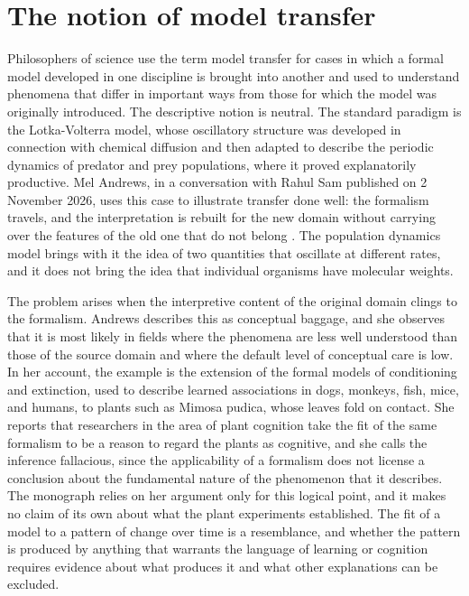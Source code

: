 \documentclass[11pt]{report}
\theoremstyle{remark}
\theoremstyle{definition}
\begin{document}
\section{The notion of model transfer}

Philosophers of science use the term model transfer for cases in which a formal model developed in one discipline is brought into another and used to understand phenomena that differ in important ways from those for which the model was originally introduced. The descriptive notion is neutral. The standard paradigm is the Lotka-Volterra model, whose oscillatory structure was developed in connection with chemical diffusion and then adapted to describe the periodic dynamics of predator and prey populations, where it proved explanatorily productive. Mel Andrews, in a conversation with Rahul Sam published on 2 November 2026, uses this case to illustrate transfer done well: the formalism travels, and the interpretation is rebuilt for the new domain without carrying over the features of the old one that do not belong \cite{andrews2026}. The population dynamics model brings with it the idea of two quantities that oscillate at different rates, and it does not bring the idea that individual organisms have molecular weights.

The problem arises when the interpretive content of the original domain clings to the formalism. Andrews describes this as conceptual baggage, and she observes that it is most likely in fields where the phenomena are less well understood than those of the source domain and where the default level of conceptual care is low. In her account, the example is the extension of the formal models of conditioning and extinction, used to describe learned associations in dogs, monkeys, fish, mice, and humans, to plants such as Mimosa pudica, whose leaves fold on contact. She reports that researchers in the area of plant cognition take the fit of the same formalism to be a reason to regard the plants as cognitive, and she calls the inference fallacious, since the applicability of a formalism does not license a conclusion about the fundamental nature of the phenomenon that it describes. The monograph relies on her argument only for this logical point, and it makes no claim of its own about what the plant experiments established. The fit of a model to a pattern of change over time is a resemblance, and whether the pattern is produced by anything that warrants the language of learning or cognition requires evidence about what produces it and what other explanations can be excluded.
\end{document}
